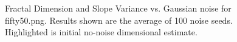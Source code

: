 \documentclass[12pt, oneside]{book}
\begin{document}
\begin{figure}[!b]
  \centering
  \caption[Fractal Dimension and Slope Variance vs. Gaussian noise for fifty50.png.]{Fractal Dimension and Slope Variance vs. Gaussian noise for fifty50.png.  Results shown are the average of 100 noise seeds.  Highlighted is initial no-noise dimensional estimate.}
  \label{fig:fifty50_gaussian_result}
\end{figure}
\end{document}
